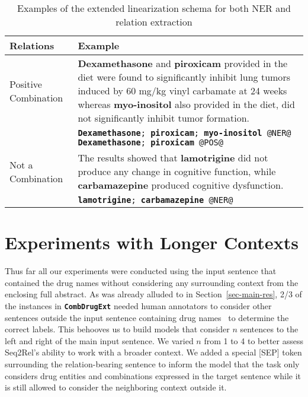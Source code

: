 \documentclass[conference]{IEEEtran}
\begin{document}
\begin{table*}[!h]
\centering
\caption{Examples of the extended linearization schema for both NER and relation extraction  \label{tab:ner}}

\begin{tabular}{p{} p{}}
\toprule
Relations &
  Example  \\ \midrule
\multirow{3.5}{*}{\parbox{4cm}{Positive Combination}} &
  \textbf{Dexamethasone} and \textbf{piroxicam} provided in the diet were found to significantly  inhibit lung tumors induced by 60 mg/kg vinyl carbamate at 24 weeks whereas \textbf{myo-inositol} also provided in the diet, did not significantly inhibit tumor  formation. \\ \cmidrule(lr){2-2}
 &
 \texttt{{\textbf{Dexamethasone}; }{\textbf{piroxicam}; }{\textbf{myo-inositol} @NER@} {\textbf{Dexamethasone}; }{\textbf{piroxicam} @POS@}}  
   \\ \midrule
\multirow{3.5}{*}{\parbox{4cm}{Not a Combination}} &
  The results showed that \textbf{lamotrigine} did not produce any change in cognitive function, while \textbf{carbamazepine} produced cognitive dysfunction. \\ \cmidrule(lr){2-2}
 &
\texttt{{\textbf{lamotrigine}; }{\textbf{carbamazepine}} @NER@} 
   \\ \bottomrule
\end{tabular}
\vspace{-3mm}
\end{table*}


\section{Experiments with Longer Contexts}
\label{sec-long}
Thus far all our experiments were conducted using the input sentence that contained the drug names without considering any surrounding context from the enclosing full abstract. As was already alluded to in Section~\ref{sec-main-res}, 2/3 of the instances in \textbf{\texttt{CombDrugExt}} needed human annotators to consider other sentences outside the input sentence containing drug names~\cite{tiktinsky-etal-2022-dataset} to determine the correct labels. This behooves us to build models that consider $n$ sentences to the left and right of the main input sentence. 
We varied $n$ from 1 to 4 to better assess Seq2Rel's ability to work with a broader context. We added a special [SEP] token surrounding the relation-bearing sentence to inform the model that the task only considers drug entities and combinations expressed in the target sentence while it is still allowed to consider the neighboring context outside it. 
\end{document}
